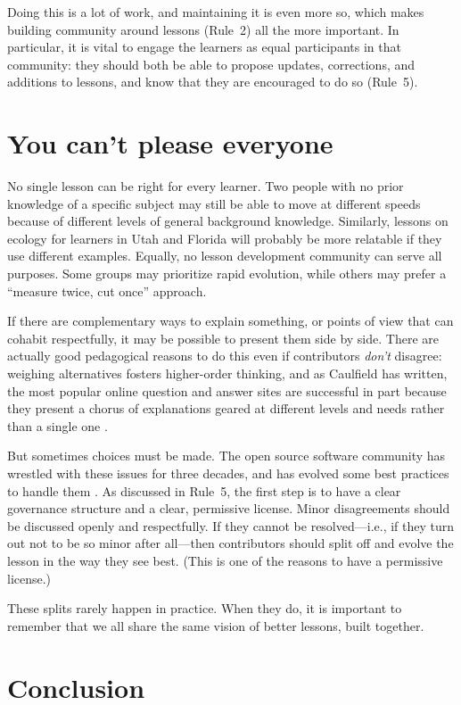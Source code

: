 \documentclass[10pt,letterpaper]{article}
\newcommand{\rulemajor}[1]{\section{#1}}
\begin{document}
Doing this is a lot of work,
and maintaining it is even more so,
which makes building community around lessons (Rule~2) all the more important.
In particular,
it is vital to engage the learners as equal participants in that community:
they should both be able to propose updates, corrections, and additions to lessons,
and know that they are encouraged to do so (Rule~5).

\rulemajor{You can't please everyone}

No single lesson can be right for every learner.
Two people with no prior knowledge of a specific subject
may still be able to move at different speeds
because of different levels of general background knowledge.
Similarly,
lessons on ecology for learners in Utah and Florida
will probably be more relatable if they use different examples.
Equally,
no lesson development community can serve all purposes.
Some groups may prioritize rapid evolution,
while others may prefer a ``measure twice, cut once'' approach.

If there are complementary ways to explain something,
or points of view that can cohabit respectfully,
it may be possible to present them side by side.
There are actually good pedagogical reasons to do this
even if contributors \emph{don't} disagree:
weighing alternatives fosters higher-order thinking,
and as Caulfield has written,
the most popular online question and answer sites
are successful in part because they present a chorus of explanations
geared at different levels and needs
rather than a single one \cite{choral-explanations}.

But sometimes choices must be made.
The open source software community has wrestled with these issues for three decades,
and has evolved some best practices to handle them
\cite{producing-oss}.
As discussed in Rule~5,
the first step is to have a clear governance structure and a clear, permissive license.
Minor disagreements should be discussed openly and respectfully.
If they cannot be resolved---i.e., if they turn out not to be so minor after all---then
contributors should split off and evolve the lesson in the way they see best.
(This is one of the reasons to have a permissive license.)

These splits rarely happen in practice.
When they do,
it is important to remember that we all share the same vision of better lessons, built together.

\section*{Conclusion}
\end{document}
